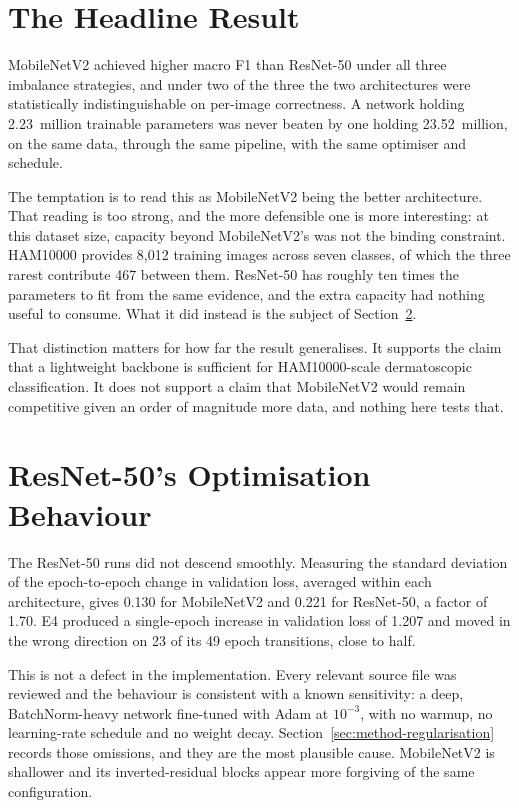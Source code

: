 \section{The Headline Result}
\label{sec:disc-headline}

MobileNetV2 achieved higher macro F1 than ResNet-50 under all three imbalance
strategies, and under two of the three the two architectures were statistically
indistinguishable on per-image correctness. A network holding 2.23~million trainable
parameters was never beaten by one holding 23.52~million, on the same data, through the
same pipeline, with the same optimiser and schedule.

The temptation is to read this as MobileNetV2 being the better architecture. That reading
is too strong, and the more defensible one is more interesting: at this dataset size,
capacity beyond MobileNetV2's was not the binding constraint. HAM10000 provides 8{,}012
training images across seven classes, of which the three rarest contribute 467 between
them. ResNet-50 has roughly ten times the parameters to fit from the same evidence, and
the extra capacity had nothing useful to consume. What it did instead is the subject of
Section~\ref{sec:disc-instability}.

That distinction matters for how far the result generalises. It supports the claim that
a lightweight backbone is sufficient for HAM10000-scale dermatoscopic classification. It
does not support a claim that MobileNetV2 would remain competitive given an order of
magnitude more data, and nothing here tests that.

\section{ResNet-50's Optimisation Behaviour}
\label{sec:disc-instability}

The ResNet-50 runs did not descend smoothly. Measuring the standard deviation of the
epoch-to-epoch change in validation loss, averaged within each architecture, gives 0.130
for MobileNetV2 and 0.221 for ResNet-50, a factor of 1.70. E4 produced a single-epoch
increase in validation loss of 1.207 and moved in the wrong direction on 23 of its 49
epoch transitions, close to half.

This is not a defect in the implementation. Every relevant source file was reviewed and
the behaviour is consistent with a known sensitivity: a deep, BatchNorm-heavy network
fine-tuned with Adam at $10^{-3}$, with no warmup, no learning-rate schedule and no
weight decay. Section~\ref{sec:method-regularisation} records those omissions, and they
are the most plausible cause. MobileNetV2 is shallower and its inverted-residual blocks
appear more forgiving of the same configuration.

